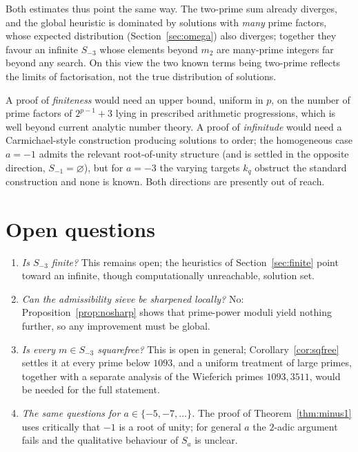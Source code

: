 \documentclass[11pt,reqno]{amsart}
\theoremstyle{plain}
\theoremstyle{definition}
\theoremstyle{remark}
\begin{document}
Both estimates thus point the same way. The two-prime sum already diverges, and the global
heuristic is dominated by solutions with \emph{many} prime factors, whose expected distribution
(Section~\ref{sec:omega}) also diverges; together they favour an infinite $S_{-3}$ whose elements
beyond $m_{2}$ are many-prime integers far beyond any search. On this view the two known terms
being two-prime reflects the limits of factorisation, not the true distribution of solutions.

A proof of \emph{finiteness} would need an upper bound, uniform in $p$, on the number of prime
factors of $2^{p-1}+3$ lying in prescribed arithmetic progressions, which is well beyond current
analytic number theory. A proof of \emph{infinitude} would need a Carmichael-style construction
producing solutions to order; the homogeneous case $a=-1$ admits the relevant root-of-unity
structure (and is settled in the opposite direction, $S_{-1}=\varnothing$), but for $a=-3$ the
varying targets $k_{q}$ obstruct the standard construction and none is known. Both directions are
presently out of reach.

\section{Open questions}

\begin{enumerate}[label=\arabic*.]
\item \emph{Is $S_{-3}$ finite?} This remains open; the heuristics of Section~\ref{sec:finite}
point toward an infinite, though computationally unreachable, solution set.
\item \emph{Can the admissibility sieve be sharpened locally?} No: Proposition~\ref{prop:nosharp}
shows that prime-power moduli yield nothing further, so any improvement must be global.
\item \emph{Is every $m\in S_{-3}$ squarefree?} This is open in general;
Corollary~\ref{cor:sqfree} settles it at every prime below $1093$, and a uniform treatment of
large primes, together with a separate analysis of the Wieferich primes $1093,3511$, would be
needed for the full statement.
\item \emph{The same questions for $a\in\{-5,-7,\dots\}$.} The proof of Theorem~\ref{thm:minus1}
uses critically that $-1$ is a root of unity; for general $a$ the $2$-adic argument fails and the
qualitative behaviour of $S_{a}$ is unclear.
\end{enumerate}
\end{document}
